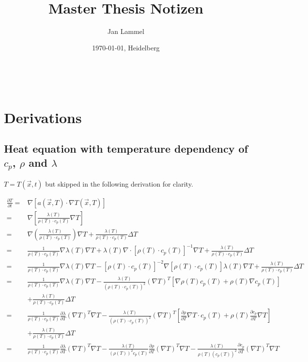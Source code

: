 \documentclass{scrartcl}[12pt, halfparskip]
\title{Master Thesis Notizen}
\author{Jan Lammel}
\date{\today{}, Heidelberg}
\begin{document}
\maketitle \ \\ 
\newpage

\section{Derivations}
\subsection{Heat equation with temperature dependency of $c_p$, $\rho$ and $\lambda$}


$T = T(\vec{x},t)$ but skipped in the following derivation for clarity.

\begin{align*}
	\frac{\partial T}{\partial t} = & \nabla \left[ a(\vec{x},T) \cdot \nabla T(\vec{x},T) \right] \\
	= & \nabla \left[ \frac{\lambda(T)}{\rho(T) \cdot c_p(T)} \nabla T \right] \\
	= & \nabla \left( \frac{\lambda(T)}{\rho(T) \cdot c_p(T)} \right) \nabla T + \frac{\lambda(T)}{\rho(T) \cdot c_p(T)} \Delta T \\
	= & \frac{1}{\rho (T) \cdot c_p (T)} \nabla \lambda (T) \nabla T + \lambda (T) \nabla \cdot \left[ \rho (T) \cdot c_p (T) \right]^{-1} \nabla T + \frac{\lambda (T)}{\rho (T) \cdot c_p (T)} \Delta T \\
	= & \frac{1}{\rho (T) \cdot c_p (T)} \nabla \lambda (T) \nabla T - \left[ \rho (T) \cdot c_p (T) \right]^{-2} \nabla \left[ \rho (T) \cdot c_p (T) \right] \lambda(T) \nabla T + \frac{\lambda (T)}{\rho (T) \cdot c_p (T)} \Delta T \\
	= & \frac{1}{\rho (T) \cdot c_p (T)} \nabla \lambda (T) \nabla T - \frac{\lambda (T)}{(\rho(T) \cdot c_p(T))^2} (\nabla T)^T \left[ \nabla \rho(T) c_p(T) + \rho(T) \nabla c_p(T) \right] \\
	& + \frac{\lambda (T)}{\rho (T) \cdot c_p (T)} \Delta T \\
	= & \frac{1}{\rho (T) \cdot c_p (T)} \frac{\partial \lambda}{\partial T} (\nabla T)^T \nabla T - \frac{\lambda (T)}{(\rho(T) \cdot c_p(T))^2} (\nabla T)^T \left[ \frac{\partial \rho}{\partial T} \nabla T \cdot c_p(T) + \rho(T) \frac{ \partial c_p}{\partial T} \nabla T \right] \\
	& + \frac{\lambda (T)}{\rho (T) \cdot c_p (T)} \Delta T \\
	= & \frac{1}{\rho (T) \cdot c_p (T)} \frac{\partial \lambda}{\partial T} (\nabla T)^T \nabla T - \frac{\lambda (T)}{(\rho(T))^2 c_p(T)} \frac{\partial \rho}{\partial T} (\nabla T)^T \nabla T - \frac{\lambda (T)}{\rho(T) (c_p(T))^2} \frac{\partial c_p}{\partial T} (\nabla T)^T \nabla T \\

\end{align*}
\end{document}
